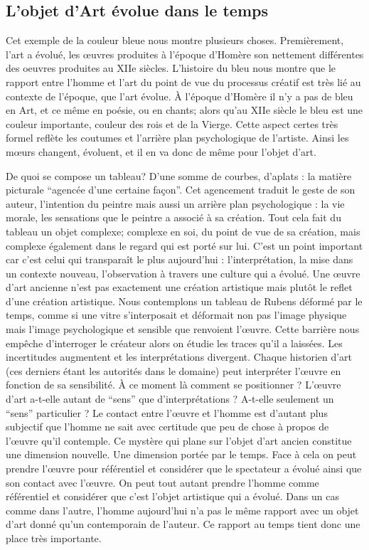 \subsection{L'objet d'Art évolue dans le temps}	
\xspace
	Cet exemple de la couleur bleue nous montre plusieurs choses. Premièrement, l'art a évolué, les \oe{}uvres produites à l'époque d'Homère son nettement différentes des oeuvres produites au XIIe siècles. L'histoire du bleu nous montre que le rapport entre l'homme et l'art du point de vue du processus créatif est très lié au contexte de l’époque, que l'art évolue. À l'époque d'Homère il n'y a pas de bleu en Art, et ce même en poésie, ou en chants; alors qu'au XIIe siècle le bleu est une couleur importante, couleur des rois et de la Vierge. Cette aspect certes très formel reflète les coutumes et l'arrière plan psychologique de l'artiste. Ainsi les m\oe{}urs changent, évoluent, et il en va donc de même pour l'objet d'art.

 	De quoi se compose un tableau? D'une somme de courbes, d'aplats : la matière picturale “agencée d'une certaine façon”. Cet agencement traduit le geste de son auteur, l'intention du peintre mais aussi un arrière plan psychologique : la vie morale, les sensations que le peintre a associé à sa création. Tout cela fait du tableau un objet complexe; complexe en soi, du point de vue de sa création, mais complexe également dans le regard qui est porté sur lui. C'est un point important car c'est celui qui transparaît le plus aujourd'hui : l'interprétation, la mise dans un contexte nouveau, l'observation à travers une culture qui a évolué. Une \oe{}uvre d'art ancienne n'est pas exactement une création artistique mais plutôt le reflet d'une création artistique. Nous contemplons un tableau de Rubens déformé par le temps, comme si une vitre s'interposait et déformait non pas l'image physique mais l'image psychologique et sensible que renvoient l'\oe{}uvre. Cette barrière nous empêche d'interroger le créateur alors on étudie les traces qu'il a laissées. Les incertitudes augmentent et les interprétations divergent. Chaque historien d'art (ces derniers étant les autorités dans le domaine) peut interpréter l'\oe{}uvre en fonction de sa sensibilité. À ce moment là comment se positionner ? L'\oe{}uvre d'art a-t-elle autant de “sens” que d'interprétations ? A-t-elle seulement un “sens” particulier ? Le contact entre l'\oe{}uvre et l'homme est d'autant plus subjectif que l'homme ne sait avec certitude que peu de chose à propos de l'\oe{}uvre qu'il contemple. Ce mystère qui plane sur l'objet d'art ancien constitue une dimension nouvelle. Une dimension portée par le temps. Face à cela on peut prendre l'\oe{}uvre pour référentiel et considérer que le spectateur a évolué ainsi que son contact avec l'\oe{}uvre. On peut tout autant prendre l'homme comme référentiel et considérer que c'est l'objet artistique qui a évolué. Dans un cas comme dans l'autre, l'homme aujourd’hui n'a pas le même rapport avec un objet d'art donné qu'un contemporain de l'auteur. Ce rapport au temps tient donc une place très importante. 
